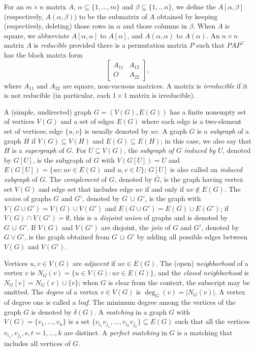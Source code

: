 \documentclass[12pt]{article}
\theoremstyle{definition}
\theoremstyle{definition}
\theoremstyle{definition}
\numberwithin{figure}{section}
\numberwithin{equation}{section}
\newcommand{\OL}{\overline}
\newcommand{\du}{\mathbin{\,\sqcup\,}}
\begin{document}
For an $m\times n$ matrix 
$A$, $\alpha \subseteq \{1,\ldots, m\}$ and $\beta\subseteq\{1,\ldots n\}$,  we define the  $A[\alpha, \beta]$ (respectively, $A(\alpha, \beta)$) to be the submatrix of $A$ obtained by keeping (respectively, deleting) 
those rows in $\alpha$ and those columns in $\beta$.
When $A$ is square, we abbreviate 
$A[\alpha,\alpha]$ to $A[\alpha]$, and $A(\alpha, \alpha)$ to $A(\alpha)$.
An $n\times n$ matrix $A$  is \textit{reducible} provided there is a permutation matrix $P$ such that 
$PAP^\top$ has the block matrix form 
\[
\begin{bmatrix}
A_{11} & A_{12}
\\
O & A_{22}
\end{bmatrix},
\]
where 
$A_{11}$ and $A_{22}$ are square, non-vacuous matrices. 
A matrix is \textit{irreducible} if it is not reducible  (in particular, each $1\times 1$ matrix is irreducible). 





 A (simple,  undirected) graph $G=(V(G),E(G))$ has a finite nonempty set of vertices $V(G)$ and a set of edges $E(G)$ where each edge is a two-element set of vertices; edge $\{u,v\}$ is usually denoted by $uv$.  
 A graph $G$ is a \emph{subgraph} of a graph $H$ if $V(G)\subseteq V(H)$ and $E(G)\subseteq E(H)$; in this case, we also say that $H$ is a \emph{supergraph} of  {$G$}.  For $U\subseteq V(G)$, the \emph{subgraph  of $G$ induced by $U$}, denoted by $G[U]$, is the subgraph of $G$ with $V(G[U])=U$ and $E(G[U])=\{uv\colon uv \in E(G) \mbox{ and } u,v\in U\}$; $G[U]$ is also called an 
\emph{induced subgraph} of $G$. 
The \emph{complement} of $G$, denoted by $\OL{G}$, is the graph having vertex set $V(G)$ and edge set that includes edge $uv$ if and only if $uv\not\in E(G)$. 
The \emph{union} of graphs $G$ and $G'$, denoted by  $G\,\cup\, G'$, is the graph with $V(G\cup G')=V(G)\cup V(G')$ and $E(G\cup G')=E(G)\cup E(G')$; if $V(G)\cap V(G')=\emptyset$, this is a \emph{disjoint union} of graphs and is denoted by $G\du G'$. If $V(G)$ and $V(G')$ are disjoint, the \emph{join} of $G$ and $G'$, denoted by $G\vee G'$,  is the graph obtained from $G\du  G'$ by adding all possible edges between $V(G)$ and $V(G')$.  
 
Vertices $u,v\in V(G)$ are \emph{adjacent}  if $uv\in E(G)$. 
The (open) \emph{neighborhood} of a vertex $v$ is $N_G(v)=\{u\in V(G)\colon uv\in E(G)\}$, and the \emph{closed neighborhood} is $N_G[v]=N_G(v)\cup\{v\}$; when $G$ is clear from the context, the subscript may be omitted.  The \emph{degree}  of a vertex $v\in V(G)$ is $\deg_G(v)=|N_G(v)|$. 
A vertex of degree one is called a \emph{leaf}. The minimum degree among the vertices of the graph $G$ is denoted by $\delta(G)$.   A \emph{matching} in a graph $G$ with $V(G)=\{v_1,\dots,v_n\}$ is a set  $\{v_{i_1}v_{j_1},\dots, v_{i_k}v_{j_k}\}\subseteq E(G)$ such that  all the vertices $v_{i_s}, v_{j_t}, s,t=1,\dots,k$ are distinct. A \emph{perfect matching} in  $G$ is a matching that includes all vertices of $G$.
 
\end{document}
